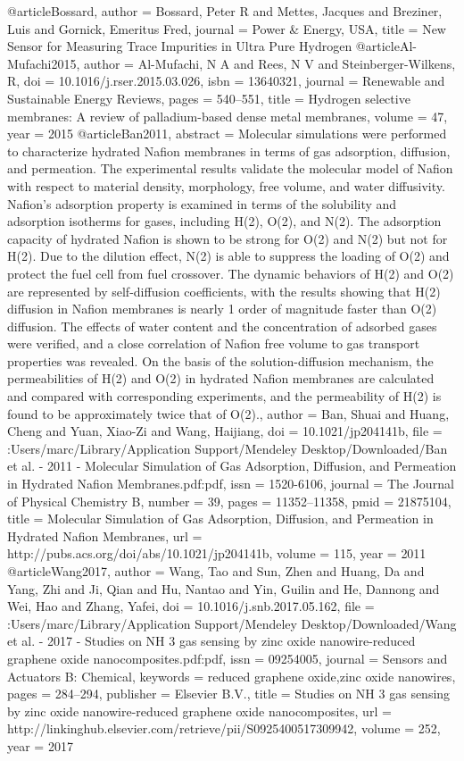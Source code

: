 @article{Bossard,
author = {Bossard, Peter R and Mettes, Jacques and Breziner, Luis and Gornick, Emeritus Fred},
journal = {Power {\&} Energy, USA},
title = {{New Sensor for Measuring Trace Impurities in Ultra Pure Hydrogen}}
}
@article{Al-Mufachi2015,
author = {Al-Mufachi, N A and Rees, N V and Steinberger-Wilkens, R},
doi = {10.1016/j.rser.2015.03.026},
isbn = {13640321},
journal = {Renewable and Sustainable Energy Reviews},
pages = {540--551},
title = {{Hydrogen selective membranes: A review of palladium-based dense metal membranes}},
volume = {47},
year = {2015}
}
@article{Ban2011,
abstract = {Molecular simulations were performed to characterize hydrated Nafion membranes in terms of gas adsorption, diffusion, and permeation. The experimental results validate the molecular model of Nafion with respect to material density, morphology, free volume, and water diffusivity. Nafion's adsorption property is examined in terms of the solubility and adsorption isotherms for gases, including H(2), O(2), and N(2). The adsorption capacity of hydrated Nafion is shown to be strong for O(2) and N(2) but not for H(2). Due to the dilution effect, N(2) is able to suppress the loading of O(2) and protect the fuel cell from fuel crossover. The dynamic behaviors of H(2) and O(2) are represented by self-diffusion coefficients, with the results showing that H(2) diffusion in Nafion membranes is nearly 1 order of magnitude faster than O(2) diffusion. The effects of water content and the concentration of adsorbed gases were verified, and a close correlation of Nafion free volume to gas transport properties was revealed. On the basis of the solution-diffusion mechanism, the permeabilities of H(2) and O(2) in hydrated Nafion membranes are calculated and compared with corresponding experiments, and the permeability of H(2) is found to be approximately twice that of O(2).},
author = {Ban, Shuai and Huang, Cheng and Yuan, Xiao-Zi and Wang, Haijiang},
doi = {10.1021/jp204141b},
file = {:Users/marc/Library/Application Support/Mendeley Desktop/Downloaded/Ban et al. - 2011 - Molecular Simulation of Gas Adsorption, Diffusion, and Permeation in Hydrated Nafion Membranes.pdf:pdf},
issn = {1520-6106},
journal = {The Journal of Physical Chemistry B},
number = {39},
pages = {11352--11358},
pmid = {21875104},
title = {{Molecular Simulation of Gas Adsorption, Diffusion, and Permeation in Hydrated Nafion Membranes}},
url = {http://pubs.acs.org/doi/abs/10.1021/jp204141b},
volume = {115},
year = {2011}
}
@article{Wang2017,
author = {Wang, Tao and Sun, Zhen and Huang, Da and Yang, Zhi and Ji, Qian and Hu, Nantao and Yin, Guilin and He, Dannong and Wei, Hao and Zhang, Yafei},
doi = {10.1016/j.snb.2017.05.162},
file = {:Users/marc/Library/Application Support/Mendeley Desktop/Downloaded/Wang et al. - 2017 - Studies on NH 3 gas sensing by zinc oxide nanowire-reduced graphene oxide nanocomposites.pdf:pdf},
issn = {09254005},
journal = {Sensors and Actuators B: Chemical},
keywords = {reduced graphene oxide,zinc oxide nanowires},
pages = {284--294},
publisher = {Elsevier B.V.},
title = {{Studies on NH 3 gas sensing by zinc oxide nanowire-reduced graphene oxide nanocomposites}},
url = {http://linkinghub.elsevier.com/retrieve/pii/S0925400517309942},
volume = {252},
year = {2017}
}
